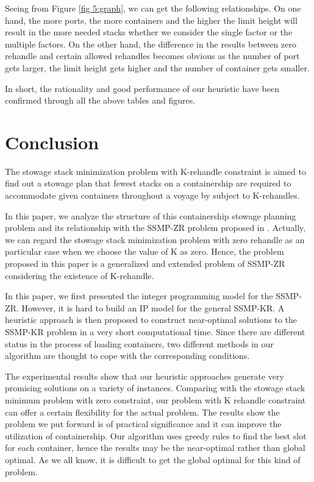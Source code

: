 \documentclass[review,3p,times,authoryear,12pt]{elsarticle}
\begin{document}
Seeing from Figure \ref{fig 5:graph}, we can get the following relationships.
On one hand, the more ports, the more containers and the higher the limit height will result in the more needed stacks whether we consider the single factor or the multiple factors.
On the other hand, the difference in the results between zero rehandle and certain allowed rehandles becomes obvious as the number of port gets larger, the limit height gets higher and the number of container gets smaller.

In short, the rationality and good performance of our heuristic have been confirmed through all the above tables and figures.

\section{Conclusion}
\label{sec:con}
The stowage stack minimization problem with K-rehandle constraint is aimed to find out a stowage plan that fewest stacks on a containership are
required to accommodate given containers throughout a voyage by subject to K-rehandles.

In this paper, we analyze the structure of this containership stowage planning problem and its relationship with the SSMP-ZR problem proposed in \cite{wang2014stowage}.
Actually, we can regard the stowage stack minimization problem with zero rehandle as an particular case when we choose the value of K as zero.
Hence, the problem proposed in this paper is a generalized and extended problem of SSMP-ZR considering the existence of K-rehandle.

In this paper, we first presented the integer programming model for the SSMP-ZR. However, it is hard to build an IP model for the general SSMP-KR.
A heuristic approach is then proposed to construct near-optimal solutions to the SSMP-KR problem in a very short computational time.
Since there are different status in the process of loading containers, two different methods in our algorithm are thought to cope with the corresponding conditions.

The experimental results show that our heuristic approaches generate very promising solutions on a variety of instances.
Comparing with the stowage stack minimum problem with zero constraint, our problem with K rehandle constraint can offer a certain flexibility for the actual problem.
The results show the problem we put forward is of practical significance and it can improve the utilization of containership.
Our algorithm uses greedy rules to find the best slot for each container, hence the results may be the near-optimal rather than global optimal.
As we all know, it is difficult to get the global optimal for this kind of problem.
\end{document}
